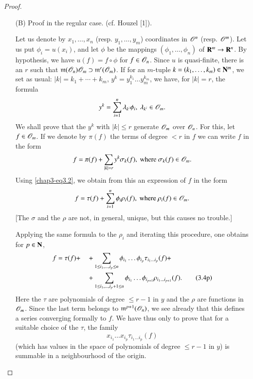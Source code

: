 \begin{proof}
\begin{itemize}
\item[(B)] {\rm Proof in the regular case.} (cf. Houzel [1]).

Let us denote by $x_{1},\ldots,x_{n}$ (resp. $y_{1},\ldots,y_{m}$) coordinates in $\mathscr{O}^{n}$ (resp. $\mathscr{O}^{m}$). Let us put $\phi_{i}=u(x_{i})$, and let $\phi$ be the mappings $(\phi_{1},\ldots,\phi_{n})$ of $\mathbf{R}^{m}\to \mathbf{R}^{n}$. By hypothesis, we have $u(f)=f\circ \phi$ for $f\in \mathscr{O}_{n}$. Since $u$ is quasi-finite, there is an $r$ such that $\mathfrak{m}(\mathscr{O}_{n})\mathscr{O}_{m}\supset \mathfrak{m}^{r}(\mathscr{O}_{m})$. If for an $m$-tuple $k=(k_{1},\ldots,k_{m})\in \mathbf{N}^{m}$, we set as usual: $|k|=k_{1}+\cdots+k_{m}$, $y^{k}=y^{k_{1}}_{1}\ldots y^{k_{m}}_{m}$, we have, for $|k|=r$, the formula
\setcounter{equation}{1}
\begin{equation}
y^{k}=\sum\limits^{n}_{i=1}\lambda_{k^{i}}\phi_{i}, \ \lambda_{k^{i}}\in \mathscr{O}_{m}.\label{chap3-eq3.2}
\end{equation}
We shall prove that the $y^{k}$ with $|k|\leq r$ generate $\mathscr{O}_{m}$ over $\mathscr{O}_{n}$. For this, let $f\in \mathscr{O}_{m}$. If we denote by $\pi(f)$ the terms of degree $<r$ in $f$ we can write $f$ in the form
\begin{equation}
f=\pi(f)+\sum\limits_{|k|=r}y^{k}\sigma_{k}(f),\text{ where } \sigma_{k}(f)\in \mathscr{O}_{m}.\label{chap3-eq3.3}
\end{equation}
Using \eqref{chap3-eq3.2}, we obtain from this an expression of $f$ in the form
\begin{equation}
f=\tau(f)+\sum\limits^{n}_{i=1}\phi_{i}\rho_{i}(f),\text{ where } \rho_{i}(f)\in \mathscr{O}_{m}.\label{chap3-eq3.4}
\end{equation}
[The $\sigma$ and the $\rho$ are not, in general, unique, but this causes no trouble.]

Applying the same formula to the $\rho_{i}$ and iterating this procedure, one obtains for $p\in \mathbf{N}$,
\begin{align*}
f=\tau(f) +\quad & + \sum\limits\limits_{1\leq i_{1},\ldots,i_{p}\leq n}\phi_{i_{1}}\ldots \phi_{i_{p}}\tau_{i_{1}\ldots i_{p}}(f)+\\
&+ \sum\limits_{1\leq i_{1},\ldots,i_{p}+1\leq n}\phi_{i_{1}}\ldots \phi_{i_{p+1}}\rho_{i_{1}\ldots i_{p+1}}(f).\tag{3.4p}\label{chap3-eq3.4p}
\end{align*}
Here the $\tau$ are polynomials of degree $\leq r-1$ in $y$ and the $\rho$ are functions in $\mathscr{O}_{m}$. Since the last term belongs to $\mathfrak{m}^{p+1}(\mathscr{O}_{n})$, we see already that this defines a series converging formally to $f$. We have thus only to prove that for a suitable choice of the $\tau$, the family
\begin{equation}
x_{i_{1}}\ldots x_{i_{p}}\tau_{i_{1}\ldots i_{p}}(f)\label{chap3-eq3.5}
\end{equation}
(which has values in the space of polynomials of degree $\leq r-1$ in $y$) is summable in a neighbourhood of the origin.
\end{itemize}


\end{proof}
